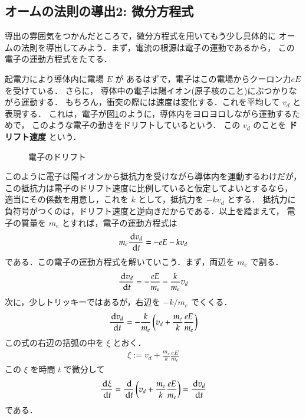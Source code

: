         \subsection{オームの法則の導出2: 微分方程式}
            導出の雰囲気をつかんだところで，微分方程式を用いてもう少し具体的に
            オームの法則を導出してみよう．まず，電流の根源は電子の運動であるから，
            この電子の運動方程式をたてる．

            起電力により導体内に電場 $E$ が
            あるはずで，電子はこの電場からクーロン力$eE$を受けている．
            さらに，
            導体中の電子は陽イオン(原子核のこと)にぶつかりながら運動する．
            もちろん，衝突の際には速度は変化する．これを平均して $v_{d}$ と表現する．
            これは，電子が図\ref{fig:11dff}のように，導体内をヨロヨロしながら運動するためで，
            このような電子の動きをドリフトしているという．
            この $v_{d}$ のことを \textbf{ドリフト速度} という．
                \begin{figure}[hbt]
                    \begin{center}
                        \label{fig:11dff}
                        \caption{電子のドリフト}
                    \end{center}
                \end{figure}

            このように電子は陽イオンから抵抗力を受けながら導体内を運動するわけだが，
            この抵抗力は電子のドリフト速度に比例していると仮定してよいとするなら，
            適当にその係数を用意し，これを $k$ として，抵抗力を $-kv_{d}$ とする．
            抵抗力に負符号がつくのは，ドリフト速度と逆向きだからである．以上を踏まえて，
            電子の質量を $m_{e}$ とすれば，電子の運動方程式は
                \begin{align}\label{eq:ohms_law_diveq_model1}
                    m_{e}\frac{\df v_{d}}{\df t}=-eE-kv_{d}
                \end{align}
            である．この電子の運動方程式を解いていこう．まず，両辺を $m_{e}$ で割る．
                \begin{align}
                    \frac{\,\mathrm{d} v_{d}}{\,\mathrm{d} t}=-\frac{eE}{m_{e}}-\frac{k}{m_{e}}v_{d}
                \end{align}
            次に，少しトリッキーではあるが，右辺を $-k/m_{e}$ でくくる．
                \begin{align}\label{eequ}
                    \frac{\df v_{d}}{\df t}=-\frac{k}{m_{e}}\left(v_{d}+\frac{m_{e}}{k}\frac{eE}{m_{e}}\right)
                \end{align}
            この式の右辺の括弧の中を $\xi $ とおく．
                \begin{align}\label{1234}
                    \xi := v_{d}+\frac{m_{e}}{k}\frac{eE}{m_{e}}
                \end{align}
            この $\xi$ を時間 $t$ で微分して
                \begin{align}\label{4321}
                    \frac{\df \xi}{\df t}=\frac{\df }{\df t}\left(v_{d}+\frac{m_{e}}{k}\frac{eE}{m_{e}}\right) =\frac{\df v_{d}}{\df t}
                \end{align}
            である．

